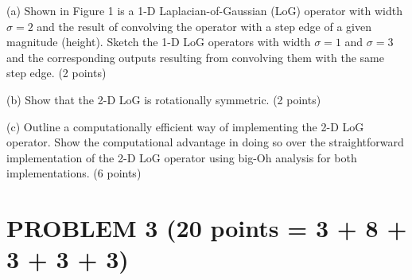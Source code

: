 \documentclass[11pt]{article}
\theoremstyle{definition}
\begin{document}
\begin{center}
\end{center}


(a) Shown in Figure 1 is a 1-D Laplacian-of-Gaussian (LoG) operator with width $\sigma=2$ and the result of convolving the operator with a step edge of a given magnitude (height). Sketch the 1-D LoG operators with width $\sigma=1$ and $\sigma=3$ and the corresponding outputs resulting from convolving them with the same step edge. (2 points)

(b) Show that the 2-D LoG is rotationally symmetric. (2 points)

(c) Outline a computationally efficient way of implementing the 2-D LoG operator. Show the computational advantage in doing so over the straightforward implementation of the 2-D LoG operator using big-Oh analysis for both implementations. (6 points)

\newpage

\section*{PROBLEM 3 (20 points = 3 + 8 + 3 + 3 + 3)}
\end{document}
